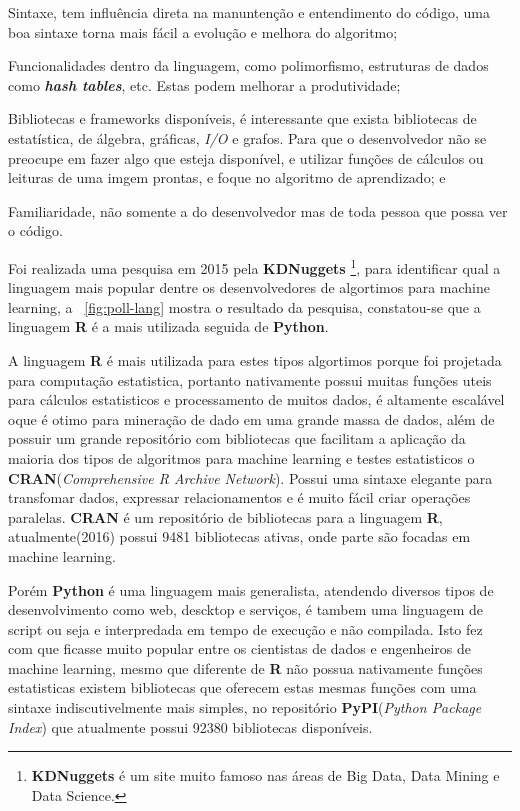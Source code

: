 \begin{alineas}
    \item Sintaxe, tem influência direta na manuntenção e entendimento do código, uma boa sintaxe torna mais fácil a evolução e melhora do algoritmo;
    \item Funcionalidades dentro da linguagem, como polimorfismo, estruturas de dados como \textbf{\textit{hash tables}}, etc. 
		  Estas podem melhorar a produtividade; 
    \item Bibliotecas e frameworks disponíveis, é interessante que exista bibliotecas de estatística, de álgebra, gráficas, \textit{I/O} e grafos. Para que
          o desenvolvedor não se preocupe em fazer algo que esteja disponível, 
		  e utilizar funções de cálculos ou leituras de uma imgem prontas, e foque no algoritmo de aprendizado; e
    \item Familiaridade, não somente a do desenvolvedor mas de toda pessoa que possa ver o código.     
\end{alineas}

Foi realizada uma pesquisa em 2015 pela \textbf{KDNuggets} \footnote{\textbf{KDNuggets} é um site muito famoso nas áreas de Big Data, Data Mining e Data Science.}, para identificar qual a linguagem mais popular dentre os desenvolvedores de algortimos para 
machine learning, a ~\autoref{fig:poll-lang} mostra o resultado da pesquisa, constatou-se que a linguagem \textbf{R} é a mais utilizada seguida de 
\textbf{Python}.   


A linguagem \textbf{R} é mais utilizada para estes tipos algortimos porque foi projetada para computação estatistica, portanto 
nativamente possui muitas funções uteis para cálculos estatisticos e processamento de muitos dados, é 
altamente escalável oque é otimo para mineração de dado em uma grande massa de dados, além de possuir um grande repositório com 
bibliotecas que facilitam a aplicação da maioria dos tipos de algoritmos para machine learning e testes estatisticos o 
\textbf{CRAN}(\textit{Comprehensive R Archive Network}). 
Possui uma sintaxe elegante para transfomar dados, expressar relacionamentos e é muito fácil criar operações paralelas.
\textbf{CRAN} é um repositório de bibliotecas para a linguagem \textbf{R}, atualmente(2016) possui 9481 bibliotecas ativas, 
onde parte são focadas em machine learning.


Porém \textbf{Python} é uma linguagem mais generalista, atendendo diversos tipos de desenvolvimento como web, descktop e serviços, 
é tambem uma linguagem de script ou seja e interpredada em tempo de execução e não compilada. 
Isto fez com que ficasse muito popular entre os cientistas de dados e engenheiros de machine learning, mesmo que diferente de 
\textbf{R} não possua nativamente funções estatisticas existem bibliotecas que oferecem estas mesmas funções com uma sintaxe
indiscutivelmente mais simples, no repositório \textbf{PyPI}(\textit{Python Package Index}) que atualmente possui 92380 bibliotecas disponíveis.      

